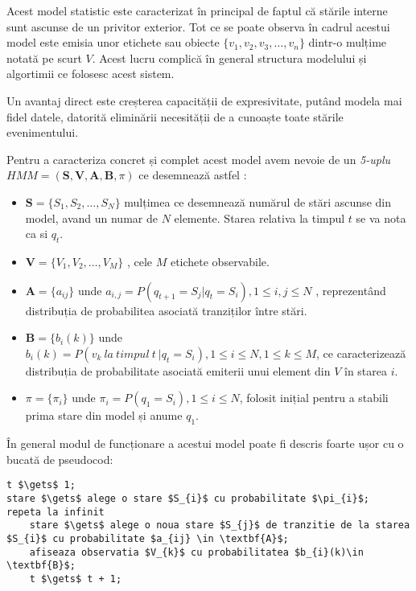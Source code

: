Acest model statistic este caracterizat în principal de faptul că stările interne sunt ascunse de un privitor exterior. Tot ce se poate observa în cadrul acestui model este emisia unor etichete sau obiecte 
$\{v_{1},v_{2},v_{3},\dots,v_{n}\}$ dintr-o mulțime notată pe scurt $V$. Acest lucru complică în general structura modelului și algortimii ce folosesc acest sistem. \par

Un avantaj direct este creșterea capacității de expresivitate, putând modela mai fidel datele, datorită eliminării necesității de a cunoaște toate stările evenimentului.\par

Pentru a caracteriza concret și complet acest model avem nevoie de un \textit{5-uplu} $ HMM = (\textbf{S},\textbf{V},\textbf{A},\textbf{B},\pi)$ ce desemnează astfel : \par
\begin{itemize}
\item{$\textbf{S} = \{S_{1},S_{2},\dots,S_{N}\}$ mulțimea ce desemnează numărul de stări ascunse din model, avand un numar de $N$ elemente. Starea relativa la timpul $t$ se va nota ca si $q_{t}$.}
\item{$\textbf{V} = \{V_{1},V_{2},\dots,V_{M}\}$ , cele $M$ etichete observabile.}
\item{$\textbf{A} = \{a_{ij}\}$ unde $a_{i,j} = P(q_{t+1} = S_{j} | q_{t} = S_{i}) , 1 \leq i , j \leq N$ , reprezentând distribuția de probabilitea asociată tranziților între stări.}
\item{$\textbf{B} = \{b_{i}(k)\}$ unde $b_{i}(k) = P(v_{k}\ la\ timpul\ t\ | q_{t} = S_{i}), 1 \leq i \leq N , 1 \leq k \leq M$, ce caracterizează distribuția de probabilitate asociată emiterii unui element din $V$ în starea $i$.}
\item{$\pi = \{\pi_{i}\}$ unde $\pi_{i} = P(q_{1} = S_{i}) , 1 \leq i \leq N$, folosit inițial pentru a stabili prima stare din model și anume $q_{1}$.}
\end{itemize}
\par

În general modul de funcționare a acestui model poate fi descris foarte ușor cu o bucată de pseudocod:

\begin{lstlisting}[mathescape=true]
t $\gets$ 1;
stare $\gets$ alege o stare $S_{i}$ cu probabilitate $\pi_{i}$;
repeta la infinit
	stare $\gets$ alege o noua stare $S_{j}$ de tranzitie de la starea $S_{i}$ cu probabilitate $a_{ij} \in \textbf{A}$;
	afiseaza observatia $V_{k}$ cu probabilitatea $b_{i}(k)\in \textbf{B}$;
	t $\gets$ t + 1;
\end{lstlisting}

